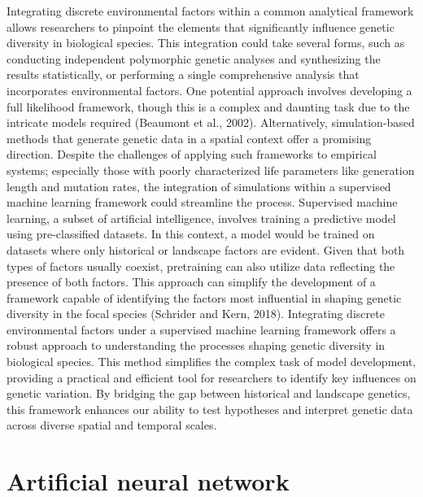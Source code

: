 \documentclass[
]{article}
\begin{document}
Integrating discrete environmental factors within a common analytical
framework allows researchers to pinpoint the elements that significantly
influence genetic diversity in biological species. This integration
could take several forms, such as conducting independent polymorphic
genetic analyses and synthesizing the results statistically, or
performing a single comprehensive analysis that incorporates
environmental factors. One potential approach involves developing a full
likelihood framework, though this is a complex and daunting task due to
the intricate models required (Beaumont et al., 2002). Alternatively,
simulation-based methods that generate genetic data in a spatial context
offer a promising direction. Despite the challenges of applying such
frameworks to empirical systems; especially those with poorly
characterized life parameters like generation length and mutation rates,
the integration of simulations within a supervised machine learning
framework could streamline the process. Supervised machine learning, a
subset of artificial intelligence, involves training a predictive model
using pre-classified datasets. In this context, a model would be trained
on datasets where only historical or landscape factors are evident.
Given that both types of factors usually coexist, pretraining can also
utilize data reflecting the presence of both factors. This approach can
simplify the development of a framework capable of identifying the
factors most influential in shaping genetic diversity in the focal
species (Schrider and Kern, 2018). Integrating discrete environmental
factors under a supervised machine learning framework offers a robust
approach to understanding the processes shaping genetic diversity in
biological species. This method simplifies the complex task of model
development, providing a practical and efficient tool for researchers to
identify key influences on genetic variation. By bridging the gap
between historical and landscape genetics, this framework enhances our
ability to test hypotheses and interpret genetic data across diverse
spatial and temporal scales.

\hypertarget{artificial-neural-network}{%
\section{Artificial neural network}\label{artificial-neural-network}}
\end{document}
